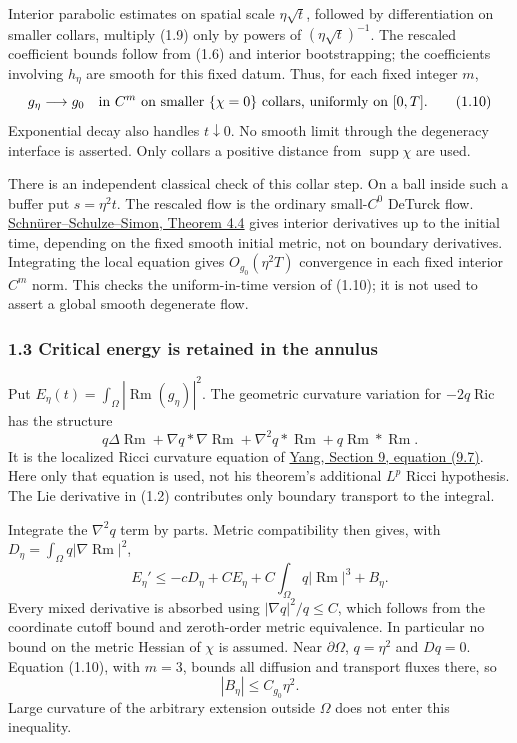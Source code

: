\documentclass[
  10pt,
]{article}
\begin{document}
Interior parabolic estimates on spatial scale \(\eta\sqrt t\), followed
by differentiation on smaller collars, multiply (1.9) only by powers of
\((\eta\sqrt t)^{-1}\). The rescaled coefficient bounds follow from
(1.6) and interior bootstrapping; the coefficients involving \(h_\eta\)
are smooth for this fixed datum. Thus, for each fixed integer \(m\), \[
 g_\eta\longrightarrow g_0\quad\hbox{in }C^m
 \text{ on smaller }\{\chi=0\}\text{ collars, uniformly on }[0,T].
                                                               \tag{1.10}
\] Exponential decay also handles \(t\downarrow0\). No smooth limit
through the degeneracy interface is asserted. Only collars a positive
distance from \(\operatorname{supp}\chi\) are used.

There is an independent classical check of this collar step. On a ball
inside such a buffer put \(s=\eta^2t\). The rescaled flow is the
ordinary small-\(C^0\) DeTurck flow.
\href{https://arxiv.org/pdf/0706.0421}{Schnürer--Schulze--Simon, Theorem
4.4} gives interior derivatives up to the initial time, depending on the
fixed smooth initial metric, not on boundary derivatives. Integrating
the local equation gives \(O_{g_0}(\eta^2T)\) convergence in each fixed
interior \(C^m\) norm. This checks the uniform-in-time version of
(1.10); it is not used to assert a global smooth degenerate flow.

\hypertarget{critical-energy-is-retained-in-the-annulus}{%
\subsubsection{1.3 Critical energy is retained in the
annulus}\label{critical-energy-is-retained-in-the-annulus}}

Put \(E_\eta(t)=\int_\Omega|\operatorname{Rm}(g_\eta)|^2\). The
geometric curvature variation for \(-2q\operatorname{Ric}\) has the
structure \[
 q\Delta\operatorname{Rm}
 +\nabla q*\nabla\operatorname{Rm}
 +\nabla^2q*\operatorname{Rm}
 +q\operatorname{Rm}*\operatorname{Rm}.
\] It is the localized Ricci curvature equation of
\href{https://www.numdam.org/item/10.24033/asens.1644.pdf}{Yang, Section
9, equation (9.7)}. Here only that equation is used, not his theorem's
additional \(L^p\) Ricci hypothesis. The Lie derivative in (1.2)
contributes only boundary transport to the integral.

Integrate the \(\nabla^2q\) term by parts. Metric compatibility then
gives, with \(D_\eta=\int_\Omega q|\nabla\operatorname{Rm}|^2\), \[
 E_\eta'\le-cD_\eta+CE_\eta+
          C\int_\Omega q|\operatorname{Rm}|^3+B_\eta. \tag{1.11}
\] Every mixed derivative is absorbed using \(|\nabla q|^2/q\le C\),
which follows from the coordinate cutoff bound and zeroth-order metric
equivalence. In particular no bound on the metric Hessian of \(\chi\) is
assumed. Near \(\partial\Omega\), \(q=\eta^2\) and \(Dq=0\). Equation
(1.10), with \(m=3\), bounds all diffusion and transport fluxes there,
so \[
                         |B_\eta|\le C_{g_0}\eta^2.   \tag{1.12}
\] Large curvature of the arbitrary extension outside \(\Omega\) does
not enter this inequality.
\end{document}
